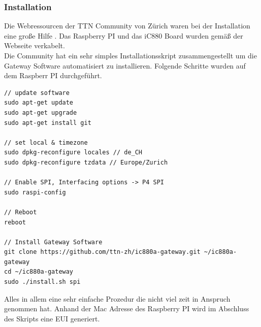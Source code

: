 \documentclass[11pt,english,german]{report}
\theoremstyle{definition}
\begin{document}
\subsubsection{Installation}
Die Webressourcen der TTN Community von Zürich waren bei der Installation eine große Hilfe \cite{ttnzürich}. Das Raspberry PI und das iC880 Board wurden gemäß der Webseite verkabelt.\\[0.3cm]
Die Community hat ein sehr simples Installationsskript zusammengestellt um die Gateway Software automatisiert zu installieren. Folgende Schritte wurden auf dem Raspberr PI durchgeführt.
\lstset{language=C++}
\begin{lstlisting}
// update software
sudo apt-get update
sudo apt-get upgrade
sudo apt-get install git

// set local & timezone
sudo dpkg-reconfigure locales // de_CH
sudo dpkg-reconfigure tzdata // Europe/Zurich

// Enable SPI, Interfacing options -> P4 SPI
sudo raspi-config

// Reboot
reboot

// Install Gateway Software
git clone https://github.com/ttn-zh/ic880a-gateway.git ~/ic880a-gateway
cd ~/ic880a-gateway
sudo ./install.sh spi
\end{lstlisting}
Alles in allem eine sehr einfache Prozedur die nicht viel zeit in Anspruch genommen hat. Anhand der Mac Adresse des Raspberry PI wird im Abschluss des Skripts eine EUI generiert.
\newpage
\end{document}

